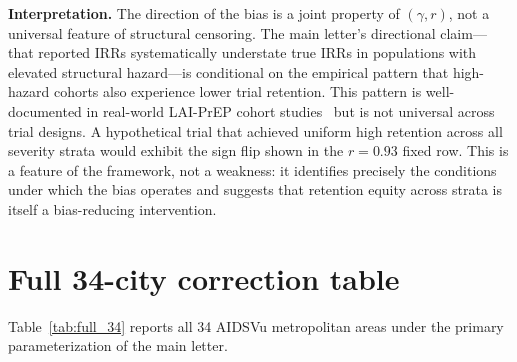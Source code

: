 \documentclass[11pt]{article}
\begin{document}
\textbf{Interpretation.} The direction of the bias is a joint property of $(\gamma, r)$, not a universal feature of structural censoring. The main letter's directional claim---that reported IRRs systematically understate true IRRs in populations with elevated structural hazard---is conditional on the empirical pattern that high-hazard cohorts also experience lower trial retention. This pattern is well-documented in real-world LAI-PrEP cohort studies~\cite{zucker2023,rusie2024} but is not universal across trial designs. A hypothetical trial that achieved uniform high retention across all severity strata would exhibit the sign flip shown in the $r = 0.93$ fixed row. This is a feature of the framework, not a weakness: it identifies precisely the conditions under which the bias operates and suggests that retention equity across strata is itself a bias-reducing intervention.

\section{Full 34-city correction table}

Table~\ref{tab:full_34} reports all 34 AIDSVu metropolitan areas under the primary parameterization of the main letter.
\end{document}
